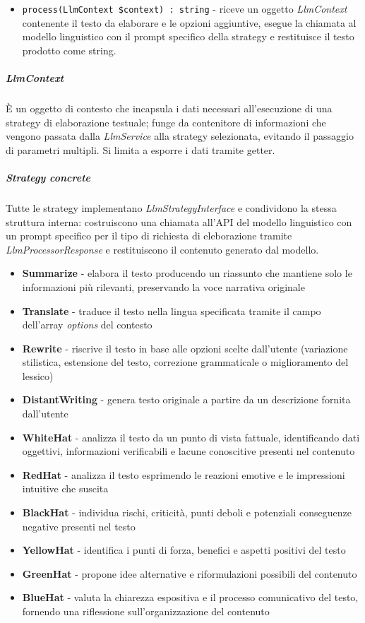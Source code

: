 \documentclass[a4paper,10pt]{article}
\begin{document}
\begin{itemize}
    \item \texttt{process(LlmContext \$context) : string} - riceve un oggetto \textit{LlmContext} contenente il testo da elaborare e le opzioni aggiuntive, esegue la chiamata al modello linguistico con il prompt specifico della strategy e restituisce il testo prodotto come string.
\end{itemize}
\subparagraph{LlmContext} È un oggetto di contesto che incapsula i dati necessari all'esecuzione di una strategy di elaborazione testuale; funge da contenitore di informazioni che vengono passata dalla \textit{LlmService} alla strategy selezionata, evitando il passaggio di parametri multipli. Si limita a esporre i dati tramite getter.
\subparagraph{Strategy concrete}
Tutte le strategy implementano \textit{LlmStrategyInterface} e condividono la stessa struttura interna: costruiscono una chiamata all'API del modello linguistico con un prompt specifico per il tipo di richiesta di eleborazione tramite \textit{LlmProcessorResponse} e restituiscono il contenuto generato dal modello. 
\begin{itemize}
    \item \textbf{Summarize} - elabora il testo producendo un riassunto che mantiene solo le informazioni più rilevanti, preservando la voce narrativa originale
    \item \textbf{Translate} - traduce il testo nella lingua specificata tramite il campo dell'array \textit{options} del contesto
    \item \textbf{Rewrite} - riscrive il testo in base alle opzioni scelte dall'utente (variazione stilistica, estensione del testo, correzione grammaticale o miglioramento del lessico)
    \item \textbf{DistantWriting} - genera testo originale a partire da un descrizione fornita dall'utente
    \item \textbf{WhiteHat} - analizza il testo da un punto di vista fattuale, identificando dati oggettivi, informazioni verificabili e lacune conoscitive presenti nel contenuto
    \item \textbf{RedHat} - analizza il testo esprimendo le reazioni emotive e le impressioni intuitive che suscita
    \item \textbf{BlackHat} - individua rischi, criticità, punti deboli e potenziali conseguenze negative presenti nel testo
    \item \textbf{YellowHat} - identifica i punti di forza, benefici e aspetti positivi del testo
    \item \textbf{GreenHat} - propone idee alternative e riformulazioni possibili del contenuto
    \item \textbf{BlueHat} - valuta la chiarezza espositiva e il processo comunicativo del testo, fornendo una riflessione sull'organizzazione del contenuto
\end{itemize}
\end{document}
